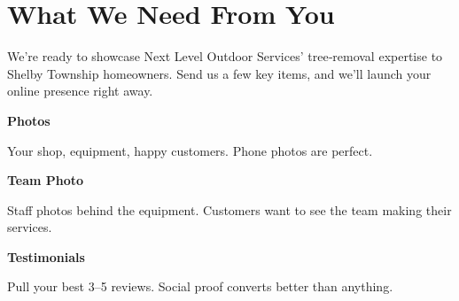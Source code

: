 \documentclass[11pt,letterpaper]{article}
\begin{document}
\vspace{0.2em}

\section*{What We Need From You}

We're ready to showcase Next Level Outdoor Services' tree‑removal expertise to Shelby Township homeowners. Send us a few key items, and we'll launch your online presence right away.

\vspace{0.12em}

\noindent\begin{minipage}[t]{0.48\textwidth}
\begin{tcolorbox}[colframe=accent-teal, boxrule=1pt, left=0.7em, right=0.7em, top=0.5em, bottom=0.5em, arc=4pt, boxsep=0pt]
{\bfseries\small\color{accent-teal}Photos}

\vspace{0.15em}

{\small Your shop, equipment, happy customers. Phone photos are perfect.}
\end{tcolorbox}

\vspace{0.1em}

\begin{tcolorbox}[colframe=accent-teal, boxrule=1pt, left=0.7em, right=0.7em, top=0.5em, bottom=0.5em, arc=4pt, boxsep=0pt]
{\bfseries\small\color{accent-teal}Team Photo}

\vspace{0.15em}

{\small Staff photos behind the equipment. Customers want to see the team making their services.}
\end{tcolorbox}

\vspace{0.1em}

\begin{tcolorbox}[colframe=accent-teal, boxrule=1pt, left=0.7em, right=0.7em, top=0.5em, bottom=0.5em, arc=4pt, boxsep=0pt]
{\bfseries\small\color{accent-teal}Testimonials}

\vspace{0.15em}

{\small Pull your best 3--5 reviews. Social proof converts better than anything.}
\end{tcolorbox}
\end{minipage}
\hfill
\end{document}
